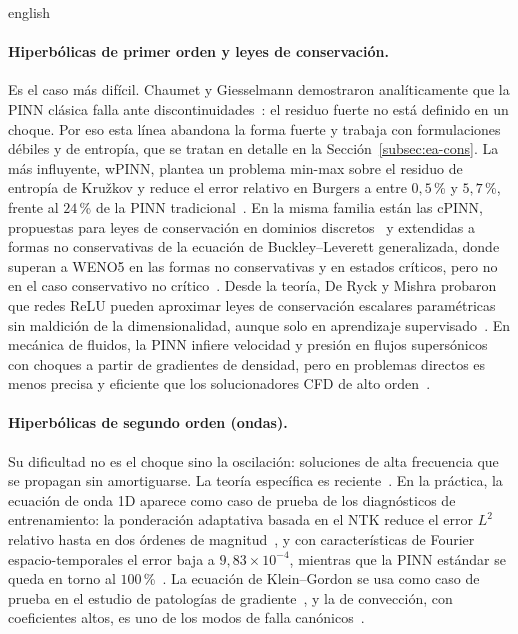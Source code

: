 \documentclass[0000.tex]{subfiles}
\begin{document}
\begin{hyphenrules}{english}
\paragraph{Hiperbólicas de primer orden y leyes de conservación.} Es el caso más difícil. Chaumet y Giesselmann demostraron analíticamente que la PINN clásica falla ante discontinuidades~\cite{chaumet2024improving}: el residuo fuerte no está definido en un choque. Por eso esta línea abandona la forma fuerte y trabaja con formulaciones débiles y de entropía, que se tratan en detalle en la Sección~\ref{subsec:ea-cons}. La más influyente, wPINN, plantea un problema min-max sobre el residuo de entropía de Kružkov y reduce el error relativo en Burgers a entre $0{,}5$\,\% y $5{,}7$\,\%, frente al $24$\,\% de la PINN tradicional~\cite{de2024wpinns}. En la misma familia están las cPINN, propuestas para leyes de conservación en dominios discretos~\cite{jagtap2020conservative} y extendidas a formas no conservativas de la ecuación de Buckley--Leverett generalizada, donde superan a WENO5 en las formas no conservativas y en estados críticos, pero no en el caso conservativo no crítico~\cite{quita2023conservative}. Desde la teoría, De Ryck y Mishra probaron que redes ReLU pueden aproximar leyes de conservación escalares paramétricas sin maldición de la dimensionalidad, aunque solo en aprendizaje supervisado~\cite{de2024error}. En mecánica de fluidos, la PINN infiere velocidad y presión en flujos supersónicos con choques a partir de gradientes de densidad, pero en problemas directos es menos precisa y eficiente que los solucionadores CFD de alto orden~\cite{cai2021physics}.

\paragraph{Hiperbólicas de segundo orden (ondas).} Su dificultad no es el choque sino la oscilación: soluciones de alta frecuencia que se propagan sin amortiguarse. La teoría específica es reciente~\cite{qian2023error}. En la práctica, la ecuación de onda 1D aparece como caso de prueba de los diagnósticos de entrenamiento: la ponderación adaptativa basada en el NTK reduce el error $L^2$ relativo hasta en dos órdenes de magnitud~\cite{wang2022and}, y con características de Fourier espacio-temporales el error baja a $9{,}83\times10^{-4}$, mientras que la PINN estándar se queda en torno al $100$\,\%~\cite{wang2021eigenvector}. La ecuación de Klein--Gordon se usa como caso de prueba en el estudio de patologías de gradiente~\cite{wang2021understanding}, y la de convección, con coeficientes altos, es uno de los modos de falla canónicos~\cite{krishnapriyan2021characterizing,rathore2024challenges}.


\end{hyphenrules}
\end{document}
